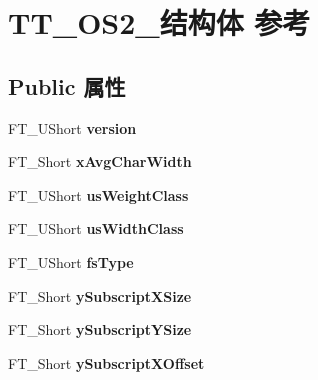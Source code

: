 \hypertarget{struct_t_t___o_s2__}{}\section{T\+T\+\_\+\+O\+S2\+\_\+结构体 参考}
\label{struct_t_t___o_s2__}
\subsection*{Public 属性}
\begin{DoxyCompactItemize}
\item 
\mbox{\label{struct_t_t___o_s2___a012ff79224cd25ae51837ca8937605c4}} 
F\+T\+\_\+\+U\+Short {\bfseries version}
\item 
\mbox{\label{struct_t_t___o_s2___af903883918479780d17a72f6fee992bd}} 
F\+T\+\_\+\+Short {\bfseries x\+Avg\+Char\+Width}
\item 
\mbox{\label{struct_t_t___o_s2___af4d8ab32a27382ea95b882d9e2615ec9}} 
F\+T\+\_\+\+U\+Short {\bfseries us\+Weight\+Class}
\item 
\mbox{\label{struct_t_t___o_s2___a8ef38b9f9c65a65aa6abf92e19236146}} 
F\+T\+\_\+\+U\+Short {\bfseries us\+Width\+Class}
\item 
\mbox{\label{struct_t_t___o_s2___ad7e436778424fe4dbe53ca8bd2a975c7}} 
F\+T\+\_\+\+U\+Short {\bfseries fs\+Type}
\item 
\mbox{\label{struct_t_t___o_s2___a3ae8d803a5055564e9f8a3926200e39c}} 
F\+T\+\_\+\+Short {\bfseries y\+Subscript\+X\+Size}
\item 
\mbox{\label{struct_t_t___o_s2___afb1b8ed1ea98badd4de58ff47b54c4c2}} 
F\+T\+\_\+\+Short {\bfseries y\+Subscript\+Y\+Size}
\item 
\mbox{\label{struct_t_t___o_s2___ab471c53b6e8a1c1f81cc410959bb5851}} 
F\+T\+\_\+\+Short {\bfseries y\+Subscript\+X\+Offset}
\item 
\mbox{\label{struct_t_t___o_s2___a94902b1f33ded0ea4c0555d54a0750fa}} 

\end{DoxyCompactItemize}
